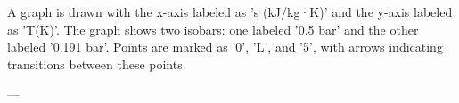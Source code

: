 A graph is drawn with the x-axis labeled as 's (kJ/kg·K)' and the y-axis labeled as 'T(K)'. The graph shows two isobars: one labeled '0.5 bar' and the other labeled '0.191 bar'. Points are marked as '0', 'L', and '5', with arrows indicating transitions between these points.

---